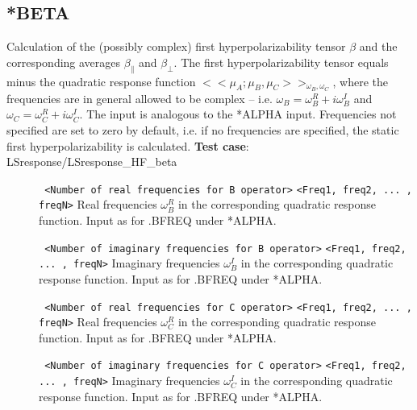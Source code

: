 \subsection{*BETA}\label{subsec:beta}
Calculation of the (possibly complex) first hyperpolarizability tensor $\beta$ and 
the corresponding averages $\beta_{\parallel}$ and
$\beta_{\perp}$. 
The first hyperpolarizability tensor equals minus the quadratic response function
$<< \mu_A; \mu_B, \mu_C >>_{\omega_B, \omega_C}$, where
the frequencies are in general allowed to be complex --
i.e. $\omega_B = \omega_B^R + i \omega_B^I$ and
$\omega_C = \omega_C^R + i \omega_C^I$.
The input is analogous to the *ALPHA input.
Frequencies not specified are set to zero by default,
i.e. if no frequencies are specified, the static first hyperpolarizability is calculated. \newline
{\bf Test case}: LSresponse/LSresponse\_HF\_beta 
\begin{description}
\item[] \verb| | \newline
\verb|<Number of real frequencies for B operator>|\newline
\verb|<Freq1, freq2, ... , freqN>|\newline
Real frequencies $\omega_B^R$ in the corresponding quadratic response function.
Input as for .BFREQ under *ALPHA.
\item[] \verb| | \newline
\verb|<Number of imaginary frequencies for B operator>|\newline
\verb|<Freq1, freq2, ... , freqN>|\newline
Imaginary frequencies $\omega_B^I$ in the corresponding quadratic response function.
Input as for .BFREQ under *ALPHA.
\item[] \verb| | \newline
\verb|<Number of real frequencies for C operator>|\newline
\verb|<Freq1, freq2, ... , freqN>|\newline
Real frequencies $\omega_C^R$ in the corresponding quadratic response function.
Input as for .BFREQ under *ALPHA.
\item[] \verb| | \newline
\verb|<Number of imaginary frequencies for C operator>|\newline
\verb|<Freq1, freq2, ... , freqN>|\newline
Imaginary frequencies $\omega_C^I$ in the corresponding quadratic response function.
Input as for .BFREQ under *ALPHA.
\end{description}

